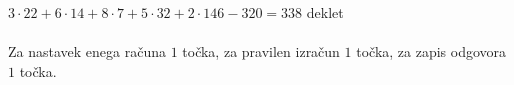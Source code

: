\documentclass[addpoints]{exam}
\begin{document}
\begin{questions}
    \begin{solution}[8cm]
        $3\cdot 22+6\cdot 14+8\cdot 7+5\cdot 32+2\cdot 146-320=338$ deklet \\ \\
        Za nastavek enega računa $1$ točka, za pravilen izračun $1$ točka, za zapis odgovora $1$ točka.
    \end{solution}

    


\end{questions}
\end{document}
